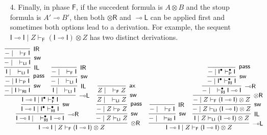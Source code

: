 \documentclass[copyright,creativecommons]{eptcs}
\theoremstyle{definition}
\newcommand{\tr}{\otimes \mathsf{R}}
\newcommand{\lright}{{\multimap}\mathsf{R}}
\newcommand{\lleft}{{\multimap}\mathsf{L}}
\newcommand{\pass}{\mathsf{pass}}
\newcommand{\unitl}{\mathsf{IL}}
\newcommand{\unitr}{\mathsf{IR}}
\newcommand{\ax}{\mathsf{ax}}
\newcommand{\ot}{\otimes}
\newcommand{\lolli}{\multimap}
\newcommand{\I}{\mathsf{I}}
\newcommand{\RI}{\mathsf{RI}}
\newcommand{\LI}{\mathsf{LI}}
\newcommand{\Pass}{\mathsf{P}}
\newcommand{\F}{\mathsf{F}}
\begin{document}
\begin{enumerate}
\begin{equation*}
\begin{array}{cc}
{{{{          }
            }
          }
        }
  \end{array}
  \normalsize
\end{equation*}
\item[4.] Finally, in phase $\F$, if the succedent formula is $A \ot B$ and the stoup formula is $A' \lolli B'$, then both $\tr$ and $\lleft$ can be applied first and sometimes both options lead to a derivation. For example, the sequent 
$\I \lolli \I \mid Z \vdash_{\F} (\I \lolli \I) \ot Z$ has two distinct derivations. 
\begin{equation*}
\hspace*{-5mm}
\small
  \begin{array}{cc}
    \infer[\tr]{\I \lolli \I \mid Z \vdash_{\F} (\I \lolli \I) \ot Z}{
      \infer[\lright]{\I \lolli \I \mid \quad \vdash^{\bullet}_{\RI} \I \lolli \I}{
        \infer[\mathsf{sw}]{\I \lolli \I \mid \I^{\bullet} \vdash^{\bullet}_{\RI} \I}{
          \infer[\lleft]{\I \lolli \I \mid \I^{\bullet} \vdash^{\bullet}_{\F} \I}{
            \infer[\mathsf{sw}]{{-} \mid \I \vdash_{\RI} \I}{
              \infer[\pass]{{-} \mid \I \vdash_{\Pass} \I}{
                \infer[\unitl]{\I \mid \quad \vdash_{\LI} \I}{
                  \infer[\mathsf{sw}]{{-} \mid \quad \vdash_{\LI} \I}{
                    \infer[\unitr]{{-} \mid \quad \vdash_{\F} \I}{}
                  }
                }
              }
            }
            &
            \infer[\unitl]{\I \mid \quad \vdash_{\LI} \I}{
              \infer[\mathsf{sw}]{{-} \mid \quad \vdash_{\LI} \I}{
                \infer[\unitr]{{-} \mid \quad \vdash_{\F} \I}{}
              }
            }
          }
        }
      }
      &
      \infer[\mathsf{sw}]{{-} \mid Z \vdash_{\LI} Z}{
        \infer[\pass]{{-} \mid Z \vdash_{\Pass} Z}{
          \infer[\mathsf{sw}]{Z \mid \quad \vdash_{\LI} Z}{
            \infer[\ax]{Z \mid \quad \vdash_{\F} Z}{}
          }
        }
      }
    }
    &
    \infer[\lleft]{\I \lolli \I \mid Z \vdash_{\F} (\I \lolli \I) \ot Z}{
      \infer[\mathsf{sw}]{{-} \mid \quad \vdash_{\RI} \I}{
        \infer[\unitr]{{-} \mid \quad \vdash_{\F} \I}{}
      }
      &
      \infer[\unitl]{\I \mid Z \vdash_{\LI} (\I \lolli \I) \ot Z}{
        \infer[\mathsf{sw}]{{-} \mid Z \vdash_{\LI} (\I \lolli \I) \ot Z}{
          \infer[\tr]{{-} \mid Z \vdash_{\F} (\I \lolli \I) \ot Z}{
            \infer[\lright]{{-} \mid \quad \vdash^{\bullet}_{\RI} \I \lolli \I}{
              \infer[\mathsf{sw}]{{-} \mid \I^{\bullet} \vdash^{\bullet}_{\RI} \I}{
                \infer[\pass]{{-} \mid \I^{\bullet} \vdash^{\bullet}_{\Pass} \I}{
}}}}}}}
\end{array}
\end{equation*}
\end{enumerate}
\end{document}
